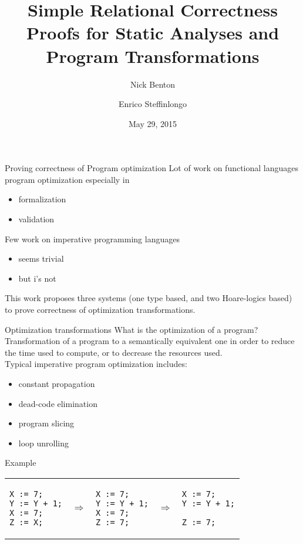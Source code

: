 \documentclass[11pt]{beamer}
\author{Enrico Steffinlongo}
\title{Simple Relational Correctness Proofs for
Static Analyses and Program Transformations}
\subtitle{Nick Benton}
\institute{Università Ca' Foscari - Computer science}
\date{May 29, 2015}
\begin{document}
\begin{frame}
\titlepage
\end{frame}


\begin{frame}{Proving correctness of Program optimization}
Lot of work on functional languages program optimization especially in
\begin{itemize}
\item formalization
\item validation
\end{itemize}
Few work on imperative programming languages
\begin{itemize}
\item seems trivial
\item but i's not
\end{itemize}
This work proposes three systems (one type based, and two Hoare-logics based) to prove correctness of optimization transformations.
\end{frame}

\begin{frame}[fragile]{Optimization transformations}
What is the optimization of a program?\\
Transformation of a program to a semantically equivalent one in order to reduce the time used to compute, or to decrease the resources used.\\
Typical imperative program optimization includes:
\begin{itemize}
\item constant propagation
\item dead-code elimination
\item program slicing
\item loop unrolling
\end{itemize}
Example\\
\begin{tabular}{lclcl}
\begin{lstlisting}
X := 7;
Y := Y + 1;
X := 7;
Z := X;
\end{lstlisting}&$\Rightarrow$& 
\begin{lstlisting}
X := 7;
Y := Y + 1;
X := 7;
Z := 7;
\end{lstlisting}&$\Rightarrow$&
\begin{lstlisting}
X := 7;
Y := Y + 1;

Z := 7;
\end{lstlisting}
\end{tabular}
\end{frame}
\end{document}
